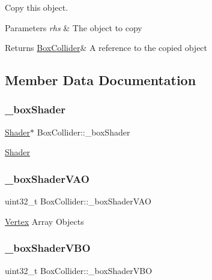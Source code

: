 Copy this object. 


\begin{DoxyParams}{Parameters}
{\em rhs} & The object to copy \\
\hline
\end{DoxyParams}
\begin{DoxyReturn}{Returns}
\hyperlink{class_box_collider}{Box\+Collider}\& A reference to the copied object 
\end{DoxyReturn}


\subsection{Member Data Documentation}
\mbox{\label{class_box_collider_ab8642b5f05444676fb3ef9bccda8ce34}} 
\subsubsection{\texorpdfstring{\+\_\+box\+Shader}{\_boxShader}}
{\footnotesize\ttfamily \hyperlink{class_shader}{Shader}$\ast$ Box\+Collider\+::\+\_\+box\+Shader\hspace{0.3cm}{\ttfamily [protected]}}

\hyperlink{class_shader}{Shader} \mbox{\label{class_box_collider_ab57de816c107545459f5b920688f9cc6}} 
\subsubsection{\texorpdfstring{\+\_\+box\+Shader\+V\+AO}{\_boxShaderVAO}}
{\footnotesize\ttfamily uint32\+\_\+t Box\+Collider\+::\+\_\+box\+Shader\+V\+AO\hspace{0.3cm}{\ttfamily [protected]}}

\hyperlink{struct_vertex}{Vertex} Array Objects \mbox{\label{class_box_collider_af2ac832bfc806b578a9b9be7d39c7946}} 
\subsubsection{\texorpdfstring{\+\_\+box\+Shader\+V\+BO}{\_boxShaderVBO}}
{\footnotesize\ttfamily uint32\+\_\+t Box\+Collider\+::\+\_\+box\+Shader\+V\+BO\hspace{0.3cm}{\ttfamily [protected]}}

